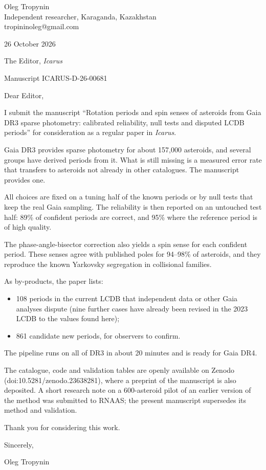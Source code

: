 \documentclass[12pt,a4paper]{article}
\begin{document}
Oleg Tropynin\\
Independent researcher, Karaganda, Kazakhstan\\
tropininoleg@gmail.com

26 October 2026

The Editor, \textit{Icarus}

Manuscript ICARUS-D-26-00681

Dear Editor,

I submit the manuscript ``Rotation periods and spin senses of asteroids from Gaia DR3 sparse photometry: calibrated reliability, null tests and disputed LCDB periods'' for consideration as a regular paper in \textit{Icarus}.

Gaia DR3 provides sparse photometry for about 157,000 asteroids, and several groups have derived periods from it. What is still missing is a measured error rate that transfers to asteroids not already in other catalogues. The manuscript provides one.

All choices are fixed on a tuning half of the known periods or by null tests that keep the real Gaia sampling. The reliability is then reported on an untouched test half: 89\% of confident periods are correct, and 95\% where the reference period is of high quality.

The phase-angle-bisector correction also yields a spin sense for each confident period. These senses agree with published poles for 94--98\% of asteroids, and they reproduce the known Yarkovsky segregation in collisional families.

As by-products, the paper lists:
\begin{itemize}[topsep=0pt,itemsep=2pt]
\item 108 periods in the current LCDB that independent data or other Gaia analyses dispute (nine further cases have already been revised in the 2023 LCDB to the values found here);
\item 861 candidate new periods, for observers to confirm.
\end{itemize}

The pipeline runs on all of DR3 in about 20 minutes and is ready for Gaia DR4.

The catalogue, code and validation tables are openly available on Zenodo (doi:10.5281/zenodo.23638281), where a preprint of the manuscript is also deposited. A short research note on a 600-asteroid pilot of an earlier version of the method was submitted to RNAAS; the present manuscript supersedes its method and validation.

Thank you for considering this work.

Sincerely,

Oleg Tropynin
\end{document}
